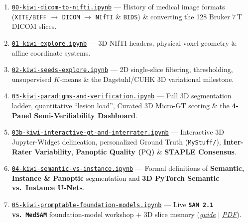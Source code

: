 \documentclass[10pt,a4paper]{article}
\newcommand{\ghblob}{https://github.com/arvidl/BMED365-2027/blob/main}
\begin{document}
\begin{seqbox}
\begin{enumerate}[start=0, itemsep=1.5pt, topsep=1pt, font=\footnotesize]
    \item \href{\ghblob/Lab4-Comp-Imag/Kiwi-challenge/notebooks/00-kiwi-dicom-to-nifti.ipynb}{\texttt{00-kiwi-dicom-to-nifti.ipynb}} --- History of medical image formats (\texttt{XITE/BIFF} $\to$ \texttt{DICOM} $\to$ \texttt{NIfTI} \& \texttt{BIDS}) \& converting the 128 Bruker 7\,T DICOM slices.
    \item \href{\ghblob/Lab4-Comp-Imag/Kiwi-challenge/notebooks/01-kiwi-explore.ipynb}{\texttt{01-kiwi-explore.ipynb}} --- 3D NIfTI headers, physical voxel geometry \& affine coordinate systems.
    \item \href{\ghblob/Lab4-Comp-Imag/Kiwi-challenge/notebooks/02-kiwi-seeds-explore.ipynb}{\texttt{02-kiwi-seeds-explore.ipynb}} --- 2D single-slice filtering, thresholding, unsupervised $K$-means \& the Dagstuhl/CUHK 3D variational milestone.
    \item \href{\ghblob/Lab4-Comp-Imag/Kiwi-challenge/notebooks/03-kiwi-paradigms-and-verification.ipynb}{\texttt{03-kiwi-paradigms-and-verification.ipynb}} --- Full 3D segmentation ladder, quantitative ``lesion load'', Curated 3D Micro-GT scoring \& the \textbf{4-Panel Semi-Verifiability Dashboard}.
    \item \href{\ghblob/Lab4-Comp-Imag/Kiwi-challenge/notebooks/03b-kiwi-interactive-gt-and-interrater.ipynb}{\texttt{03b-kiwi-interactive-gt-and-interrater.ipynb}} --- Interactive 3D Jupyter-Widget delineation, personalized Ground Truth (\texttt{MyStuff/}), \textbf{Inter-Rater Variability}, \textbf{Panoptic Quality ($\text{PQ}$)} \& \textbf{STAPLE Consensus}.
    \item \href{\ghblob/Lab4-Comp-Imag/Kiwi-challenge/notebooks/04-kiwi-semantic-vs-instance.ipynb}{\texttt{04-kiwi-semantic-vs-instance.ipynb}} --- Formal definitions of \textbf{Semantic, Instance \& Panoptic} segmentation and \textbf{3D PyTorch Semantic vs.\ Instance U-Nets}.
    \item \href{\ghblob/Lab4-Comp-Imag/Kiwi-challenge/notebooks/05-kiwi-promptable-foundation-models.ipynb}{\texttt{05-kiwi-promptable-foundation-models.ipynb}} --- Live \textbf{\texttt{SAM 2.1} vs.\ \texttt{MedSAM}} foundation-model workshop + 3D slice memory (\href{\ghblob/Lab4-Comp-Imag/Kiwi-challenge/docs/promptable-foundation-models.md}{\textit{guide}} $|$ \href{\ghblob/Lab4-Comp-Imag/Kiwi-challenge/docs/promptable-foundation-models.pdf}{\textit{PDF}}).

\end{enumerate}
\end{seqbox}
\end{document}
